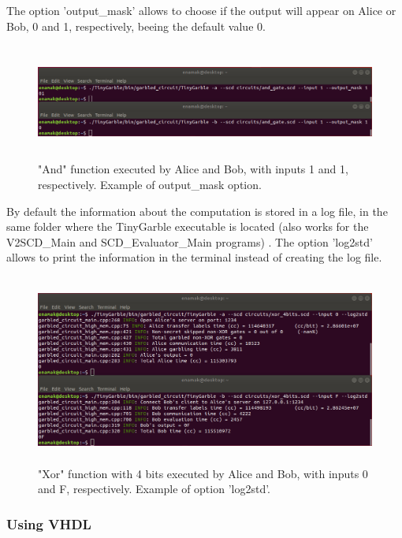 \begin{refsection}
The option 'output\_mask' allows to choose if the output will appear on Alice or Bob, 0 and 1, respectively, beeing the default value 0.

\begin{figure}[H]
	\centering
	\includegraphics[width=1\textwidth, height=3.8cm]{./sdf/tiny_garble/figures/tinygarble_and_c.png}
    \caption{"And" function executed by Alice and Bob, with inputs 1 and 1, respectively. Example of output\_mask option.}\label{fig:tinygarble_and_c}
\end{figure}

\newpage

By default the information about the computation is stored in a log file, in the same folder where the TinyGarble executable is located (also works for the V2SCD\_Main and SCD\_Evaluator\_Main programs) . The option 'log2std' allows to print the information in the terminal instead of creating the log file.

\begin{figure}[H]
	\centering
	\includegraphics[width=1\textwidth, height=6.25cm]{./sdf/tiny_garble/figures/tinygarble_xor_4bits.png}
    \caption{"Xor" function with 4 bits executed by Alice and Bob, with inputs 0 and F, respectively. Example of option 'log2std'.}\label{fig:tinygarble_xor}
\end{figure}

\subsubsection{Using VHDL}


\end{refsection}
